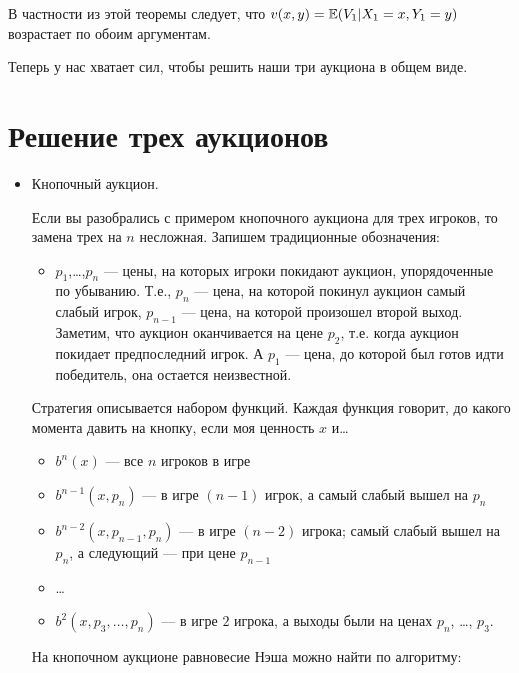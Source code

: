 В частности из этой теоремы следует, что $ v(x,y)=\mathbb{E}(V_{1}|X_{1}=x,Y_{1}=y) $ возрастает по обоим аргументам.


Теперь у нас хватает сил, чтобы решить наши три аукциона в общем виде.

\section{Решение трех аукционов}

\begin{itemize}
\item Кнопочный аукцион.

Если вы разобрались с примером кнопочного аукциона для трех игроков, то замена трех на $ n $ несложная. Запишем традиционные обозначения:

\begin{itemize}
\item $ p_{1} $,\ldots,$ p_{n} $ --- цены, на которых игроки покидают аукцион, упорядоченные по убыванию. Т.е., $ p_{n} $ --- цена, на которой покинул аукцион самый слабый игрок, $ p_{n-1} $ --- цена, на которой произошел второй выход. Заметим, что аукцион оканчивается на цене $ p_{2} $, т.е. когда аукцион покидает предпоследний игрок. А $ p_{1} $ --- цена, до которой был готов идти победитель, она остается неизвестной.
\end{itemize}


Стратегия описывается набором функций. Каждая функция говорит, до какого момента давить на кнопку, если моя ценность $ x $ и\ldots
\begin{itemize}
\item $ b^{n}(x) $ --- все $ n $ игроков в игре
\item $ b^{n-1}(x,p_{n}) $ --- в игре $ (n-1) $ игрок, а самый слабый вышел на $ p_{n} $
\item $ b^{n-2}(x,p_{n-1},p_{n}) $ ---  в игре $ (n-2) $ игрока; самый слабый вышел на $ p_{n} $, а следующий --- при цене $ p_{n-1} $
\item \ldots
\item $ b^{2}(x,p_{3},\ldots,p_{n}) $ --- в игре $ 2 $ игрока, а выходы были на ценах $p_{n}$, \ldots, $ p_{3} $.
\end{itemize}

На кнопочном аукционе равновесие Нэша можно найти по алгоритму:


\end{itemize}
